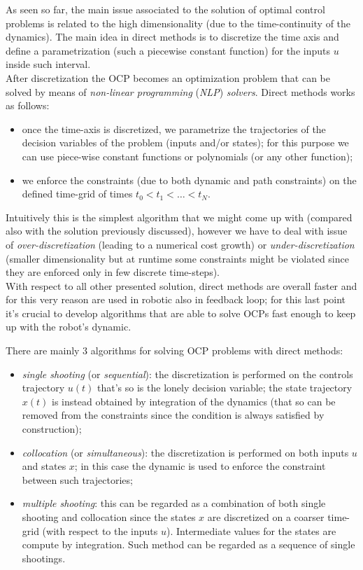 	As seen so far, the main issue associated to the solution of optimal control problems is related to the high dimensionality (due to the time-continuity of the dynamics). The main idea in direct methods is to discretize the time axis and define a parametrization (such a piecewise constant function) for the inputs $u$ inside such interval.\\
	After discretization the OCP becomes an optimization problem that can be solved by means of \textit{non-linear programming} (\textit{NLP}) \textit{solvers}. Direct methods works as follows:
	\begin{itemize}
		\item once the time-axis is discretized, we parametrize the trajectories of the decision variables of the problem (inputs and/or states); for this purpose we can use piece-wise constant functions or polynomials (or any other function);
		\item we enforce the constraints (due to both dynamic and path constraints) on the defined time-grid of times $t_0 < t_1 < \dots  < t_N$.
	\end{itemize}
	
	Intuitively this is the simplest algorithm that we might come up with (compared also with the solution previously discussed), however we have to deal with issue of \textit{over-discretization} (leading to a numerical cost growth) or \textit{under-discretization} (smaller dimensionality but at runtime some constraints might be violated since they are enforced only in few discrete time-steps).\\
	With respect to all other presented solution, direct methods are overall faster and for this very reason are used in robotic also in feedback loop; for this last point it's crucial to develop algorithms that are able to solve OCPs fast enough to keep up with the robot's dynamic.
	
	There are mainly 3 algorithms for solving OCP problems with direct methods:
	\begin{itemize}
		\item \textit{single shooting} (or \textit{sequential}): the discretization is performed on the controls trajectory $u(t)$ that's so is the lonely decision variable; the state trajectory $x(t)$ is instead obtained by integration of the dynamics (that so can be removed from the constraints since the condition is always satisfied by construction);
		\item \textit{collocation} (or \textit{simultaneous}): the discretization is performed on both inputs $u$ and states $x$; in this case the dynamic is used to enforce the constraint between such trajectories;
		\item \textit{multiple shooting}: this can be regarded as a combination of both single shooting and collocation since the states $x$ are discretized on a coarser time-grid (with respect to the inputs $u$). Intermediate values for the states are compute by integration. Such method can be regarded as a sequence of single shootings.
	\end{itemize}
	
